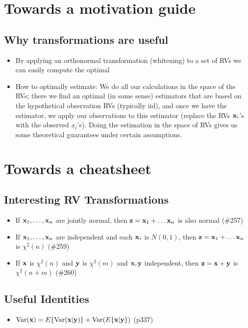 \documentclass[a4paper]{book}
\begin{document}
\chapter*{Towards a motivation guide}
\section{Why transformations are useful}
\begin{itemize}
\item By applying an orthonormal transformation (\aka whitening) to a set of RVs we can easily compute the optimal 
\item How to optimally estimate: We do all our calculations in the space of the RVs; there we find an optimal (in some sense) estimators that are based on the hypothetical observation RVs (typically iid), and once we have the estimator, we apply our observations to this estimator (\ie replace the RVs $\mathbf{x}_i$'s with the observed $x_i$'s). Doing the estimation in the space of RVs gives us some theoretical guarantees under certain assumptions.
\end{itemize}

\chapter*{Towards a cheatsheet}
\section{Interesting RV Transformations}
\begin{itemize}
\item If $\mathbf{x}_1, \hdots, \mathbf{x}_n$ are jointly normal, then $\mathbf{z} = \mathbf{x}_1 + \hdots \mathbf{x}_n$ is also normal (\#257)
\item If $\mathbf{x}_1, \hdots, \mathbf{x}_n$ are independent and each $\mathbf{x}_i$ is $N(0,1)$, then $\mathbf{z} = \mathbf{x}_1 + \hdots \mathbf{x}_n$ is $\chi^2(n)$ (\#259)
\item If $\mathbf{x}$ is $\chi^2(n)$ and $\mathbf{y}$ is $\chi^2(m)$ and $\mathbf{x,y}$ independent, then $\mathbf{z} = \mathbf{x+y}$ is $\chi^2(n+m)$ (\#260)
\end{itemize}

\section{Useful Identities}
\begin{itemize}
\item $\text{Var}(\mathbf{x}) = E\{\text{Var}(\mathbf{x|y})\} + \text{Var}(E\{\mathbf{x|y}\})$ (p337)
\end{itemize}
\end{document}
